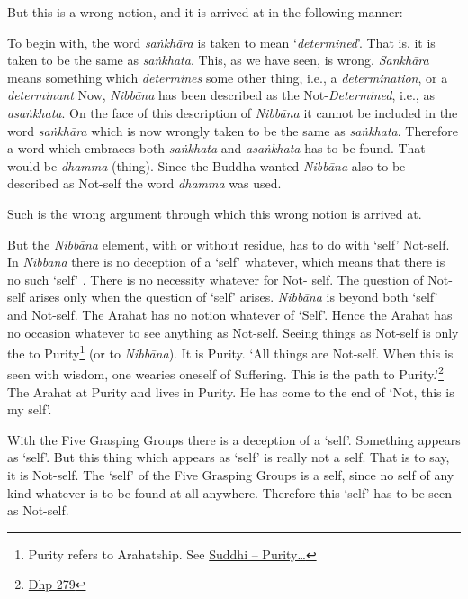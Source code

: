 But this is a wrong notion, and it is arrived at in the following manner:

To begin with, the word \emph{saṅkhāra} is taken to mean `\emph{determined}'. That is, it is taken to be the same as \emph{saṅkhata}. This, as we have seen, is wrong. \emph{Sankhāra} means something which \emph{determines} some other thing, i.e., a \emph{determination}, or a \emph{determinant} Now, \emph{Nibbāna} has been described as the Not-\emph{Determined}, i.e., as \emph{asaṅkhata}. On the face of this description of \emph{Nibbāna} it cannot be included in the word \emph{saṅkhāra} which is now wrongly taken to be the same as \emph{saṅkhata}. Therefore a word which embraces both \emph{saṅkhata} and \emph{asaṅkhata} has to be found. That would be \emph{dhamma} (thing). Since the Buddha wanted \emph{Nibbāna} also to be described as Not-self the word \emph{dhamma} was used.

Such is the wrong argument through which this wrong notion is arrived at.

But the \emph{Nibbāna} element, with or without residue, has  to do with `self'  Not-self. In \emph{Nibbāna} there is no deception of a `self' whatever, which means that there is no such `self' . There is no necessity whatever for Not- self. The question of Not-self arises only when the question of `self' arises. \emph{Nibbāna} is beyond both `self' and Not-self. The Arahat has no notion whatever of `Self'. Hence the Arahat has no occasion whatever to see anything as Not-self. Seeing things as Not-self is only the  to Purity\footnote{Purity refers to Arahatship. See \protect\hyperlink{suddhi}{Suddhi -- Purity\ldots\hspace{0pt}}} (or to \emph{Nibbāna}). It is  Purity. `All things are Not-self. When this is seen with wisdom, one wearies oneself of Suffering. This is the path to Purity.'\footnote{\href{https://suttacentral.net/dhp273-289/en/anandajoti}{Dhp 279}} The Arahat  at Purity and lives in Purity. He has come to the end of `Not, this is my self'.

With the Five Grasping Groups there is a deception of a `self'. Something appears as `self'. But this thing which appears as `self' is really not a self. That is to say, it is Not-self. The `self' of the Five Grasping Groups is  a self, since no self of any kind whatever is to be found at all anywhere. Therefore this `self' has to be seen as Not-self.

